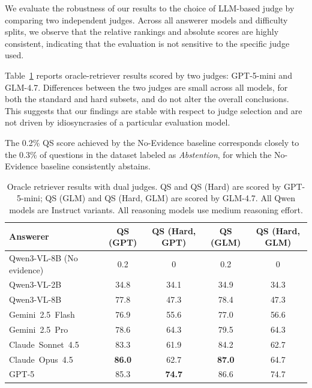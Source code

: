 \documentclass{article}
\theoremstyle{plain}
\theoremstyle{definition}
\theoremstyle{remark}
\begin{document}
We evaluate the robustness of our results to the choice of LLM-based judge by comparing two independent judges. Across all answerer models and difficulty splits, we observe that the relative rankings and absolute scores are highly consistent, indicating that the evaluation is not sensitive to the specific judge used.

Table~\ref{tab:oracle_reasoning_comparejudge} reports oracle-retriever results scored by two judges: GPT-5-mini and GLM-4.7. Differences between the two judges are small across all models, for both the standard and hard subsets, and do not alter the overall conclusions. This suggests that our findings are stable with respect to judge selection and are not driven by idiosyncrasies of a particular evaluation model.

The 0.2\% QS score achieved by the No-Evidence baseline corresponds closely to the 0.3\% of questions in the dataset labeled as \emph{Abstention}, for which the No-Evidence baseline consistently abstains.


\begin{table}[t]
\centering
\small
\setlength{\tabcolsep}{6pt}
\caption{Oracle retriever results with dual judges. QS and QS (Hard) are scored by GPT-5-mini; QS (GLM) and QS (Hard, GLM) are scored by GLM-4.7. All Qwen models are Instruct variants. All reasoning models use medium reasoning effort.}
\label{tab:oracle_reasoning_comparejudge}
\begin{tabular}{l cc cc}
\toprule
\textbf{Answerer} & \textbf{QS (GPT)} & \textbf{QS (Hard, GPT)} & \textbf{QS (GLM)} & \textbf{QS (Hard, GLM)} \\
\midrule
Qwen3-VL-8B (No evidence) & 0.2 & 0 & 0.2 & 0 \\
Qwen3-VL-2B         & 34.8 & 34.1 & 34.9 & 34.3 \\
Qwen3-VL-8B         & 77.8 & 47.3 & 78.4 & 47.3 \\
Gemini~2.5~Flash    & 76.9 & 55.6 & 77.0 & 56.6 \\
Gemini~2.5~Pro      & 78.6 & 64.3 & 79.5 & 64.3 \\
Claude~Sonnet~4.5   & 83.3 & 61.9 & 84.2 & 62.7 \\
Claude~Opus~4.5     & \textbf{86.0} & 62.7 & \textbf{87.0} & 64.7 \\
GPT-5               & 85.3 & \textbf{74.7} & 86.6 & 74.7 \\
\bottomrule
\end{tabular}
\end{table}

\end{document}
